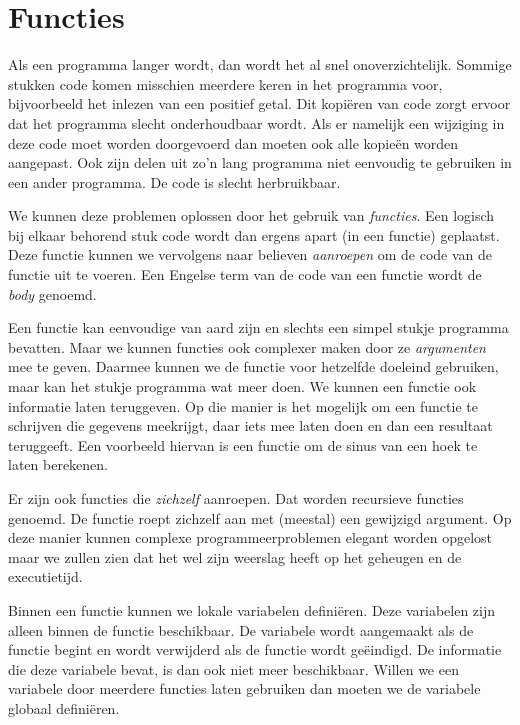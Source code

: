 \chapter{Functies}
\label{cha:functies}
\thispagestyle{empty}

Als een programma langer wordt, dan wordt het al snel onoverzichtelijk. Sommige stukken code komen misschien meerdere keren in het programma voor, bijvoorbeeld het inlezen van een positief getal. Dit kopiëren van code zorgt ervoor dat het programma slecht onderhoudbaar wordt. Als er namelijk een wijziging in deze code moet worden doorgevoerd dan moeten ook alle kopieën worden aangepast. Ook zijn delen uit zo'n lang programma niet eenvoudig te gebruiken in een ander programma. De code is slecht herbruikbaar.

We kunnen deze problemen oplossen door het gebruik van \textsl{functies}. Een logisch bij elkaar behorend stuk code wordt dan ergens apart (in een functie) geplaatst. Deze functie kunnen we vervolgens naar believen \textsl{aanroepen} om de code van de functie uit te voeren. Een Engelse term van de code van een functie wordt de \textsl{body} genoemd.

Een functie kan eenvoudige van aard zijn en slechts een simpel stukje programma bevatten. Maar we kunnen functies ook complexer maken door ze \textsl{argumenten} mee te geven. Daarmee kunnen we de functie voor hetzelfde doeleind gebruiken, maar kan het stukje programma wat meer doen. We kunnen een functie ook informatie laten teruggeven. Op die manier is het mogelijk om een functie te schrijven die gegevens meekrijgt, daar iets mee laten doen en dan een resultaat teruggeeft. Een voorbeeld hiervan is een functie om de sinus van een hoek te laten berekenen.

Er zijn ook functies die \textsl{zichzelf} aanroepen. Dat worden recursieve functies genoemd. De functie roept zichzelf aan met (meestal) een gewijzigd argument. Op deze manier kunnen complexe programmeerproblemen elegant worden opgelost maar we zullen zien dat het wel zijn weerslag heeft op het geheugen en de executietijd.

Binnen een functie kunnen we lokale variabelen definiëren. Deze variabelen zijn alleen binnen de functie beschikbaar. De variabele wordt aangemaakt als de functie begint en wordt verwijderd als de functie wordt geëindigd. De informatie die deze variabele bevat, is dan ook niet meer beschikbaar. Willen we een variabele door meerdere functies laten gebruiken dan moeten we de variabele globaal definiëren.


